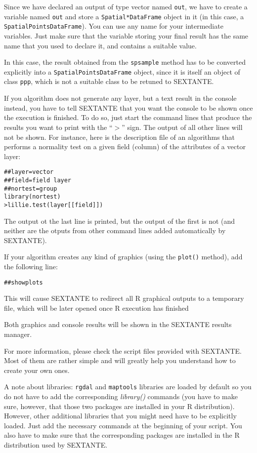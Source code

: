 Since we have declared an output of type vector named \texttt{out}, we have to create a variable named \texttt{out} and store a \texttt{Spatial*DataFrame} object in it (in this case, a \texttt{SpatialPointsDataFrame}). You can use any name for your intermediate variables. Just make sure that the variable storing your final result has the same name that you used to declare it, and contains a suitable value.

In this case, the result obtained from the \texttt{spsample} method has to be converted explicitly into a \texttt{SpatialPointsDataFrame} object, since it is itself an object of class \texttt{ppp}, which is not a suitable class to be retuned to SEXTANTE.

If you algorithm does not generate any layer, but a text result in the console instead, you have to tell SEXTANTE that you want the console to be shown once the execution is finished. To do so, just start the command lines that produce the results you want to print with the ``$>$'' sign. The output of all other lines will not be shown. For instance, here is the description file of an algorithms that performs a normality test on a given field (column) of the attributes of a vector layer:

\begin{verbatim}
##layer=vector
##field=field layer
##nortest=group
library(nortest)
>lillie.test(layer[[field]]) 	
\end{verbatim}

The output ot the last line is printed, but the output of the first is not (and neither are the otputs from other command lines added automatically by SEXTANTE).

If your algorithm creates any kind of graphics (using the \texttt{plot()} method), add the following line:

\begin{verbatim}
##showplots
\end{verbatim}

This will cause SEXTANTE to redirect all R graphical outputs to a temporary file, which will be later opened once R execution has finished

Both graphics and console results will be shown in the SEXTANTE results manager.

For more information, please check the script files provided with SEXTANTE. Most of them are rather simple and will greatly help you understand how to create your own ones.

A note about libraries: \texttt{rgdal} and \texttt{maptools} libraries are loaded by default so you do not have to add the corresponding \emph{library()} commands (you have to make sure, however, that those two packages are installed in your R distribution). However, other additional libraries that you might need have to be explicitly loaded. Just add the necessary commands at the beginning of your script. You also have to make sure that the corresponding packages are installed in the R distribution used by SEXTANTE.

